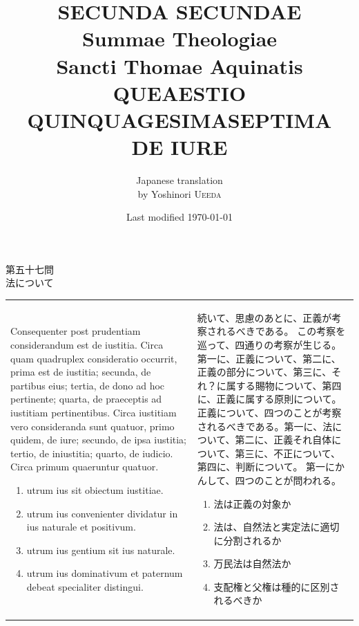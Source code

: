 \documentclass[paper=a4paper,fontsize=10pt,jafontsize=9pt,titlepage]{jlreq}
\title{{\bfseries SECUNDA SECUNDAE}\\{\Huge Summae Theologiae}\\Sancti Thomae
Aquinatis\\{\sffamily QUEAESTIO QUINQUAGESIMASEPTIMA}\\DE IURE}
\author{Japanese translation\\by Yoshinori {\scshape Ueeda}}
\date{Last modified \today}
\begin{document}
\maketitle

\begin{center}
{\Large 第五十七問\\法について}
\end{center}

\begin{longtable}{p{21em}p{21em}}

{\huge C}onsequenter post prudentiam considerandum est de iustitia. Circa quam
quadruplex consideratio occurrit, prima est de iustitia; secunda, de
partibus eius; tertia, de dono ad hoc pertinente; quarta, de praeceptis
ad iustitiam pertinentibus. Circa iustitiam vero consideranda sunt
quatuor, primo quidem, de iure; secundo, de ipsa iustitia; tertio, de
iniustitia; quarto, de iudicio. Circa primum quaeruntur quatuor. 

\begin{enumerate}
 \item  utrum ius sit obiectum iustitiae.
 \item utrum ius convenienter dividatur in ius naturale et positivum.
 \item utrum ius gentium sit ius naturale.
 \item utrum ius dominativum et paternum debeat specialiter distingui.

\end{enumerate}


&

続いて、思慮のあとに、正義が考察されるべきである。
この考察を巡って、四通りの考察が生じる。第一に、正義について、第二に、正義の部分について、第三に、それ？に属する賜物について、第四に、正義に属する原則について。
正義について、四つのことが考察されるべきである。第一に、法について、第二に、正義それ自体について、第三に、不正について、第四に、判断について。
第一にかんして、四つのことが問われる。
\begin{enumerate}
 \item 法は正義の対象か
 \item 法は、自然法と実定法に適切に分割されるか
 \item 万民法は自然法か
 \item 支配権と父権は種的に区別されるべきか
\end{enumerate}


\end{longtable}
\newpage

\end{document}
